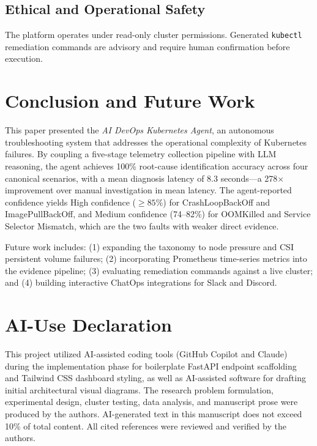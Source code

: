 \documentclass[12pt,onecolumn,draftclsnofoot]{IEEEtran}
\begin{document}
\subsection{Ethical and Operational Safety}
The platform operates under read-only cluster permissions. Generated \texttt{kubectl} remediation commands are advisory and require human confirmation before execution.

\section{Conclusion and Future Work}

This paper presented the \textit{AI DevOps Kubernetes Agent}, an autonomous troubleshooting system that addresses the operational complexity of Kubernetes failures. By coupling a five-stage telemetry collection pipeline with LLM reasoning, the agent achieves 100\% root-cause identification accuracy across four canonical scenarios, with a mean diagnosis latency of 8.3 seconds—a 278$\times$ improvement over manual investigation in mean latency. The agent-reported confidence yields High confidence ($\geq 85\%$) for CrashLoopBackOff and ImagePullBackOff, and Medium confidence (74--82\%) for OOMKilled and Service Selector Mismatch, which are the two faults with weaker direct evidence.

Future work includes: (1) expanding the taxonomy to node pressure and CSI persistent volume failures; (2) incorporating Prometheus time-series metrics into the evidence pipeline; (3) evaluating remediation commands against a live cluster; and (4) building interactive ChatOps integrations for Slack and Discord.

\section*{AI-Use Declaration}

This project utilized AI-assisted coding tools (GitHub Copilot and Claude) during the implementation phase for boilerplate FastAPI endpoint scaffolding and Tailwind CSS dashboard styling, as well as AI-assisted software for drafting initial architectural visual diagrams. The research problem formulation, experimental design, cluster testing, data analysis, and manuscript prose were produced by the authors. AI-generated text in this manuscript does not exceed 10\% of total content. All cited references were reviewed and verified by the authors.
\end{document}
